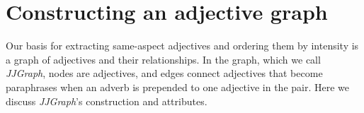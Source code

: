\documentclass[11pt,a4paper]{article}
\begin{document}















\section{Constructing an adjective graph}

Our basis for extracting same-aspect adjectives and ordering them by intensity is a graph of adjectives and their relationships. In the graph, which we call \textit{JJGraph}, nodes are adjectives, and edges connect adjectives that become paraphrases when an adverb is prepended to one adjective in the pair. Here we discuss \textit{JJGraph}'s construction and attributes.
\end{document}

